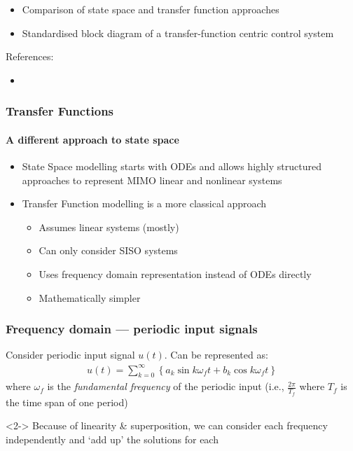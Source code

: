 \documentclass{beamer-control}
\begin{document}

\begin{SUMMARY}
\begin{itemize}
\item Comparison of state space and transfer function approaches
\item Standardised block diagram of a transfer-function centric control system
\end{itemize}
\vfill References:
\begin{itemize}
\item {}
\end{itemize}
\end{SUMMARY}


\begin{frame}
\frametitle{Transfer Functions}
\framesubtitle{A different approach to state space}

\begin{itemize}
\item State Space modelling starts with ODEs and allows highly structured approaches to represent MIMO linear and nonlinear systems
\item Transfer Function modelling is a more classical approach
\begin{itemize}
\item Assumes linear systems (mostly)
\item Can only consider SISO systems
\item Uses frequency domain representation instead of ODEs directly
\item Mathematically simpler
\end{itemize}
\end{itemize}

\end{frame}

\begin{frame}
\frametitle{Frequency domain --- periodic input signals}

Consider periodic input signal $u(t)$. Can be represented as:
\begin{align}
u(t) = \sum_{k=0}^\infty\left\{ a_k \sin k\omega_f t + b_k \cos k \omega_f t \right\}
\end{align}
where $\omega_f$ is the \emph{fundamental frequency} of the periodic input (i.e., $\tfrac{2\pi}{T_f}$ where $T_f$ is the time span of one period)

\bigskip
\begin{uncoverenv}<2->
\alert{Because of linearity \& superposition, we can consider each frequency independently and `add up' the solutions for each}
\end{uncoverenv}
\end{frame}
\end{document}
